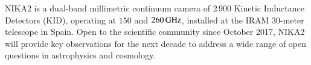 \documentclass[traditionalabstract]{aa}
\begin{document}
%
   \date{Received XXXX XX, 2019; Accepted XXXX XX, 2019}
   \abstract
       {%
         NIKA2 is a dual-band millimetric continuum
         camera of 2\,900 Kinetic Inductance Detectors (KID),
         operating at $150$ and $260\,\rm{GHz}$, installed at the IRAM 30-meter
         telescope %
          in Spain.
         Open to the scientific community since October 2017, NIKA2 
         will provide key observations for the next decade to 
         address a wide range of open questions in astrophysics and
         cosmology.}
\end{document}
